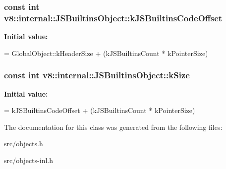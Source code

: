 \subsubsection[{k\+J\+S\+Builtins\+Code\+Offset}]{\setlength{\rightskip}{0pt plus 5cm}const int v8\+::internal\+::\+J\+S\+Builtins\+Object\+::k\+J\+S\+Builtins\+Code\+Offset\hspace{0.3cm}{\ttfamily [static]}}\label{classv8_1_1internal_1_1_j_s_builtins_object_adc167467ed32e68550558f20873f0f37}
{\bfseries Initial value\+:}
\begin{DoxyCode}
=
      GlobalObject::kHeaderSize + (kJSBuiltinsCount * kPointerSize)
\end{DoxyCode}
\hypertarget{classv8_1_1internal_1_1_j_s_builtins_object_ab933246ebec6107f95d02d96c07f28e4}{}
\subsubsection[{k\+Size}]{\setlength{\rightskip}{0pt plus 5cm}const int v8\+::internal\+::\+J\+S\+Builtins\+Object\+::k\+Size\hspace{0.3cm}{\ttfamily [static]}}\label{classv8_1_1internal_1_1_j_s_builtins_object_ab933246ebec6107f95d02d96c07f28e4}
{\bfseries Initial value\+:}
\begin{DoxyCode}
=
      kJSBuiltinsCodeOffset + (kJSBuiltinsCount * kPointerSize)
\end{DoxyCode}


The documentation for this class was generated from the following files\+:\begin{DoxyCompactItemize}
\item 
src/objects.\+h\item 
src/objects-\/inl.\+h\end{DoxyCompactItemize}
